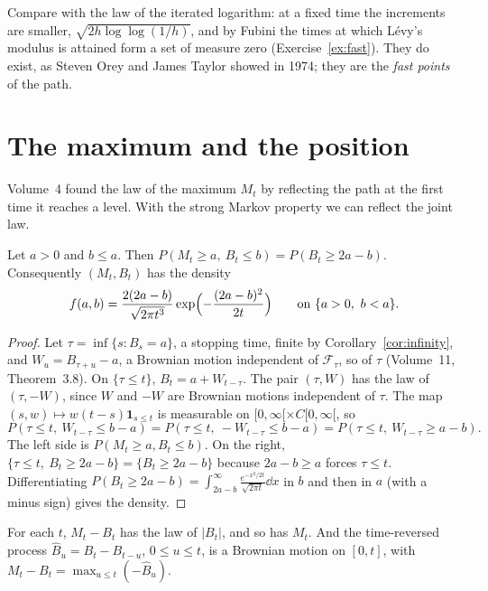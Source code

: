 Compare with the law of the iterated logarithm: at a fixed time the increments are smaller, $\sqrt{2h\log\log(1/h)}$, and by Fubini the times at which L\'evy's modulus is attained form a set of
measure zero (Exercise~\ref{ex:fast}). They do exist, as Steven Orey and James Taylor showed in 1974; they are the \emph{fast points} of the path.

\section{The maximum and the position}

Volume~4 found the law of the maximum $M_t$ by reflecting the path at the first time it reaches a level. With the strong Markov property we can reflect the joint law.

\begin{theorem}\label{thm:jointreflection}
Let $a>0$ and $b\le a$. Then $P(M_t\ge a,\ B_t\le b)=P(B_t\ge2a-b)$. Consequently $(M_t,B_t)$ has the density
\[
f(a,b)=\frac{2(2a-b)}{\sqrt{2\pi t^3}}\exp\Bigl(-\frac{(2a-b)^2}{2t}\Bigr)\qquad\text{on }\{a>0,\ b<a\}.
\]
\end{theorem}

\begin{proof}
Let $\tau=\inf\{s:B_s=a\}$, a stopping time, finite by Corollary~\ref{cor:infinity}, and $W_u=B_{\tau+u}-a$, a Brownian motion independent of $\mathcal F_\tau$, so of $\tau$ (Volume~11, Theorem~3.8). On
$\{\tau\le t\}$, $B_t=a+W_{t-\tau}$. The pair $(\tau,W)$ has the law of $(\tau,-W)$, since $W$ and $-W$ are Brownian motions independent of $\tau$. The map $(s,w)\mapsto w(t-s)\mathbf 1_{s\le t}$ is measurable
on $[0,\infty[\times C[0,\infty[$, so
\[
P(\tau\le t,\ W_{t-\tau}\le b-a)=P(\tau\le t,\ -W_{t-\tau}\le b-a)=P(\tau\le t,\ W_{t-\tau}\ge a-b).
\]
The left side is $P(M_t\ge a,B_t\le b)$. On the right, $\{\tau\le t,\ B_t\ge2a-b\}=\{B_t\ge2a-b\}$ because $2a-b\ge a$ forces $\tau\le t$. Differentiating $P(B_t\ge2a-b)=\int_{2a-b}^\infty\frac{e^{-x^2/2t}}{\sqrt{2\pi t}}\dd x$
in $b$ and then in $a$ (with a minus sign) gives the density.
\end{proof}

\begin{corollary}\label{cor:levyfixed}
For each $t$, $M_t-B_t$ has the law of $|B_t|$, and so has $M_t$. And the time-reversed process $\hat B_u=B_t-B_{t-u}$, $0\le u\le t$, is a Brownian motion on $[0,t]$, with $M_t-B_t=\max_{u\le t}(-\hat B_u)$.
\end{corollary}

